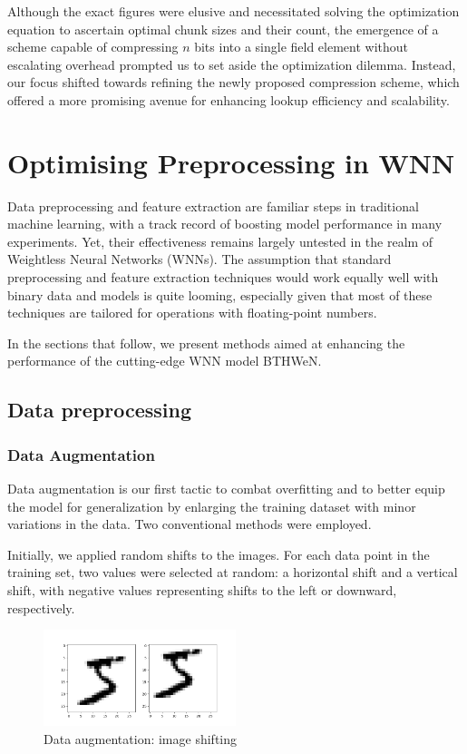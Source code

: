 \documentclass{article}[12pt]
\begin{document}
Although the exact figures were elusive and necessitated solving the optimization equation to ascertain optimal chunk sizes and their count, the emergence of a scheme capable of compressing \( n \) bits into a single field element without escalating overhead prompted us to set aside the optimization dilemma.
Instead, our focus shifted towards refining the newly proposed compression scheme, which offered a more promising avenue for enhancing lookup efficiency and scalability.

\newpage
\section{Optimising Preprocessing in WNN}\label{sec:optimising-preprocessing-in-wnn}

Data preprocessing and feature extraction are familiar steps in traditional machine learning, with a track record of boosting model performance in many experiments.
Yet, their effectiveness remains largely untested in the realm of Weightless Neural Networks (WNNs).
The assumption that standard preprocessing and feature extraction techniques would work equally well with binary data and models is quite looming, especially given that most of these techniques are tailored for operations with floating-point numbers.

In the sections that follow, we present methods aimed at enhancing the performance of the cutting-edge WNN model BTHWeN\@.

\subsection{Data preprocessing}\label{subsec:data-preprocessing}
\subsubsection*{Data Augmentation}
Data augmentation is our first tactic to combat overfitting and to better equip the model for generalization by enlarging the training dataset with minor variations in the data.
Two conventional methods were employed.

Initially, we applied random shifts to the images.
For each data point in the training set, two values were selected at random: a horizontal shift and a vertical shift, with negative values representing shifts to the left or downward, respectively.

\begin{figure}[h]
    \centering
    \includegraphics[width=0.5\textwidth]{imgs/img_shift}
    \caption{Data augmentation: image shifting}
    \label{fig:fig-1}
\end{figure}
\end{document}
